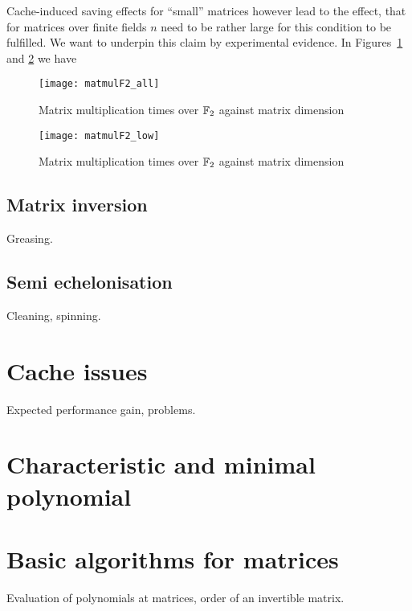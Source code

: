 Cache-induced saving effects for ``small'' matrices however lead to the
effect, that for matrices over finite fields $n$ need to be rather large
for this condition to be fulfilled. We want to underpin this claim
by experimental evidence. In Figures~\ref{matmulf2} and \ref{matmulf2scaled}
we have

\begin{figure}[ht]
\begin{center}
\texttt{[image: matmulF2\_all]}
\end{center}
\caption{Matrix multiplication times over $\mathbb{F}_2$ against matrix dimension}
\label{matmulf2}
\end{figure}

\begin{figure}[ht]
\begin{center}
\texttt{[image: matmulF2\_low]}
\end{center}
\caption{Matrix multiplication times over $\mathbb{F}_2$ against matrix dimension}
\label{matmulf2scaled}
\end{figure}


\subsection{Matrix inversion}

Greasing.

\subsection{Semi echelonisation}

Cleaning, spinning.

\section{Cache issues}
\label{sec:cache}

Expected performance gain, problems.

\section{Characteristic and minimal polynomial}
\label{sec:charminpoly}

\section{Basic algorithms for matrices}
\label{sec:basalgmat}

Evaluation of polynomials at matrices, order of an invertible matrix.

